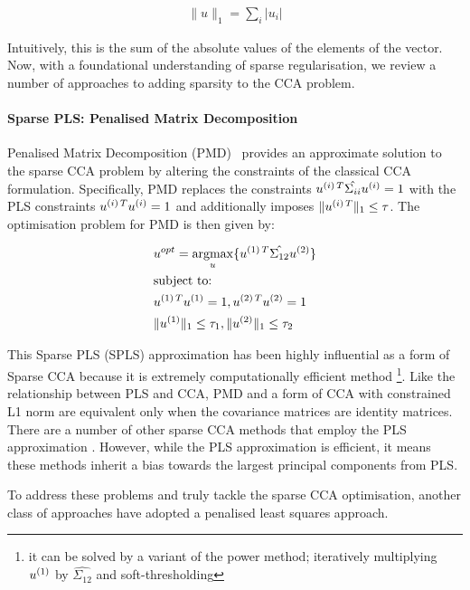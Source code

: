 \begin{align}
    \|u\|_1 = \sum_i |u_i|
\end{align}

Intuitively, this is the sum of the absolute values of the elements of the vector.
Now, with a foundational understanding of sparse regularisation, we review a number of approaches to adding sparsity to the CCA problem.

\paragraph{Sparse PLS: Penalised Matrix Decomposition}
Penalised Matrix Decomposition (PMD)~\citep{witten2009penalized} provides an approximate solution to the sparse CCA problem by altering the constraints of the classical CCA formulation.
Specifically, PMD replaces the constraints \(u^{(i)\,T} \hat{\Sigma_{ii}} u^{(i)} = 1\) with the PLS constraints \(u^{(i)\,T} u^{(i)}= 1\) and additionally imposes \(\|u^{(i)\,T}\|_1 \leq \tau\).
The optimisation problem for PMD is then given by:

\begin{align}
    & u^{opt}=\underset{u}{\mathrm{argmax}}\{ u^{(1)\,T} \hat{\Sigma_{12}} u^{(2)} \} \\
    & \text{subject to:} \notag \\
    & u^{(1)\,T} u^{(1)} = 1 , u^{(2)\,T} u^{(2)} = 1 \notag \\
    & \|u^{(1)}\|_1 \leq \tau_1 , \|u^{(2)}\|_1 \leq \tau_2 \notag
\end{align}

This Sparse PLS (SPLS) approximation has been highly influential as a form of Sparse CCA because it is extremely computationally efficient method \footnote{it can be solved by a variant of the power method; iteratively multiplying $u^{(1)}$ by $\hat{\Sigma_{12}}$ and soft-thresholding}.
Like the relationship between PLS and CCA, PMD and a form of CCA with constrained L1 norm are equivalent only when the covariance matrices are identity matrices.
There are a number of other sparse CCA methods that employ the PLS approximation \citep{parkhomenko2009sparse, waaijenborg2008quantifying, lindenbaum2021l0}.
However, while the PLS approximation is efficient, it means these methods inherit a bias towards the largest principal components from PLS.

To address these problems and truly tackle the sparse CCA optimisation, another class of approaches have adopted a penalised least squares approach.


